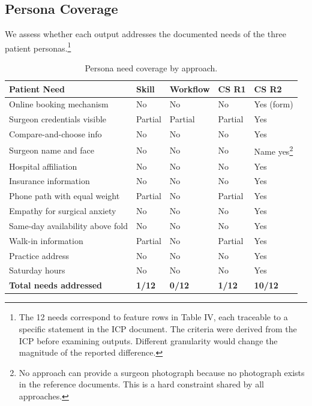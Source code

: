 \documentclass[conference]{IEEEtran}
\begin{document}
\subsection{Persona Coverage}\label{persona-coverage}

We assess whether each output addresses the documented needs of the three patient personas.\footnote{The 12 needs correspond to feature rows in Table IV, each traceable to a specific statement in the ICP document. The criteria were derived from the ICP before examining outputs. Different granularity would change the magnitude of the reported difference.}

\begin{table}[htbp]
\caption{Persona need coverage by approach.}
\centering
\small
\begin{tabular}{>{\raggedright\arraybackslash}p{}>{\centering\arraybackslash}p{}>{\centering\arraybackslash}p{}>{\centering\arraybackslash}p{}>{\centering\arraybackslash}p{}}
\toprule
Patient Need & Skill & Workflow & CS R1 & CS R2 \\
\midrule
Online booking mechanism & No & No & No & Yes (form) \\
Surgeon credentials visible & Partial & Partial & Partial & Yes \\
Compare-and-choose info & No & No & No & Yes \\
Surgeon name and face & No & No & No & Name yes\footnote{No approach can provide a surgeon photograph because
  no photograph exists in the reference documents. This is a hard
  constraint shared by all approaches.} \\
Hospital affiliation & No & No & No & Yes \\
Insurance information & No & No & No & Yes \\
Phone path with equal weight & Partial & No & Partial & Yes \\
Empathy for surgical anxiety & No & No & No & Yes \\
Same-day availability above fold & No & No & No & Yes \\
Walk-in information & Partial & No & Partial & Yes \\
Practice address & No & No & No & Yes \\
Saturday hours & No & No & No & Yes \\
\textbf{Total needs addressed} & \textbf{1/12} & \textbf{0/12} & \textbf{1/12} & \textbf{10/12} \\
\bottomrule
\end{tabular}
\end{table}
\end{document}
